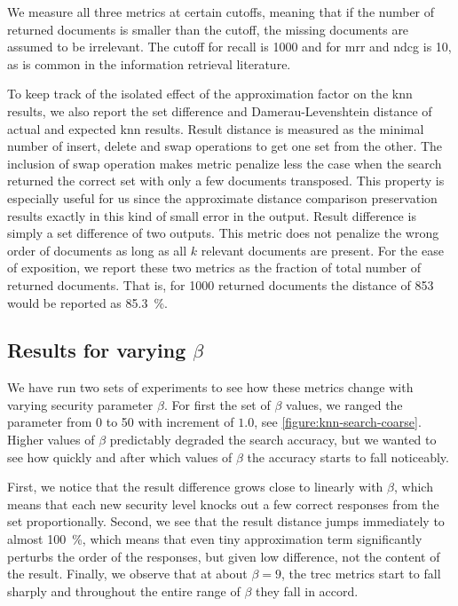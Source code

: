 				We measure all three metrics at certain cutoffs, meaning that if the number of returned documents is smaller than the cutoff, the missing documents are assumed to be irrelevant.
				The cutoff for recall is \num{1000} and for \acrshort{mrr} and \acrshort{ndcg} is 10, as is common in the information retrieval literature.

				To keep track of the isolated effect of the approximation factor on the \acrshort{knn} results, we also report the set difference and Damerau-Levenshtein distance \cite{levenshtein-distance,damerau-distance} of actual and expected \acrshort{knn} results.
				Result distance is measured as the minimal number of insert, delete and swap operations to get one set from the other.
				The inclusion of swap operation makes metric penalize less the case when the search returned the correct set with only a few documents transposed.
				This property is especially useful for us since the approximate distance comparison preservation results exactly in this kind of small error in the output.
				Result difference is simply a set difference of two outputs.
				This metric does not penalize the wrong order of documents as long as all $k$ relevant documents are present.
				For the ease of exposition, we report these two metrics as the fraction of total number of returned documents.
				That is, for \num{1000} returned documents the distance of \num{853} would be reported as \SI{85.3}{\percent}.

			\subsection{Results for varying $\beta$}

				

				We have run two sets of experiments to see how these metrics change with varying security parameter $\beta$.
				For first the set of $\beta$ values, we ranged the parameter from 0 to 50 with increment of $1.0$, see \cref{figure:knn-search-coarse}.
				Higher values of $\beta$ predictably degraded the search accuracy, but we wanted to see how quickly and after which values of $\beta$ the accuracy starts to fall noticeably.

				First, we notice that the result difference grows close to linearly with $\beta$, which means that each new security level knocks out a few correct responses from the set proportionally.
				Second, we see that the result distance jumps immediately to almost \SI{100}{\percent}, which means that even tiny approximation term significantly perturbs the order of the responses, but given low difference, not the content of the result.
				Finally, we observe that at about $\beta = 9$, the \acrshort{trec} metrics start to fall sharply and throughout the entire range of $\beta$ they fall in accord.

